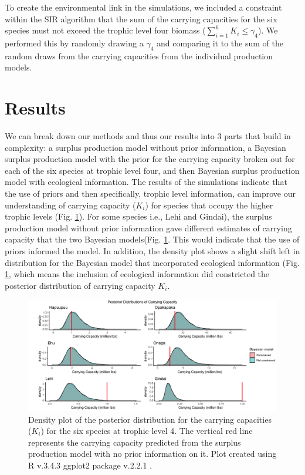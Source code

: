 \documentclass[oneside,12pt,final]{sty/ucthesis-CA2012}
\let\cite\citep                             %
\begin{document}
\begin{mainmatter}
\vspace{5mm}

To create the environmental link in the simulations, we included a constraint within the SIR algorithm that the sum of the carrying capacities for the six species must not exceed the trophic level four biomass ($\sum_{i=1}^{6} K_i \le \gamma_4$). We performed this by randomly drawing a $\gamma_4$ and comparing it to the sum of the random draws from the carrying capacities from the individual production models.


\section{Results}
We can break down our methods and thus our results into 3 parts that build in complexity: a surplus production model without prior information, a Bayesian surplus production model with the prior for the carrying capacity broken out for each of the six species at trophic level four, and then Bayesian surplus production model with ecological information. The results of the simulations indicate that the use of priors and then specifically, trophic level information, can improve our understanding of carrying capacity ($K_i$) for species that occupy the higher trophic levels (Fig. \ref{post_carrying}). For some species i.e., Lehi and Gindai), the surplus production model without prior information gave  different estimates of carrying capacity that the two Bayesian models(Fig. \ref{post_carrying}. This would indicate that the use of priors informed the model. In addition, the density plot shows a slight shift left in distribution for the Bayesian model that incorporated ecological information (Fig. \ref{post_carrying}, which means the inclusion of ecological information did constricted the posterior distribution of carrying capacity $K_i$.

\begin{figure}[H]
     \centering
       \includegraphics[width=\textwidth]{fig/post_carrying}
    \caption{Density plot of the posterior distribution for the carrying capacities ($K_i$) for the six species at trophic level 4. The vertical red line represents the carrying capacity predicted from the surplus production model with no prior information on it. Plot created using R v.3.4.3 \cite{Rcite} ggplot2 package v.2.2.1 \cite{ggplot}.}
    \label{post_carrying}
\end{figure}


\end{mainmatter}
\end{document}
